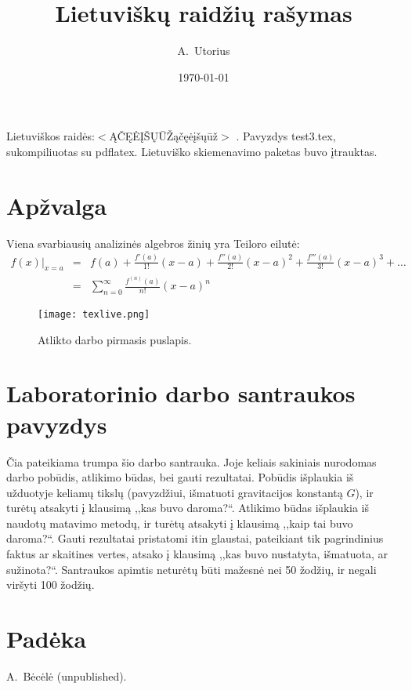 \documentclass{article}
\begin{document}
\author{A.\ Utorius}
\title{Lietuvi{\v s}kų raid{\v z}ių ra{\v s}ymas}
\date{\today}

\maketitle

Lietuviškos raid{\.e}s:$<$ĄČĘĖĮŠŲŪŽąčęėįšųūž$>$ \cite{ref1}.
Pavyzdys {\sf test3.tex}, sukompiliuotas su \textsf{pdflatex}.
Lietuviško skiemenavimo paketas buvo įtrauktas.

\section{Apžvalga}

Viena svarbiausių analizinės algebros žinių yra Teiloro eilutė:
\begin{align}
f(x)\big|_{x=a} &=& f(a)
 + \frac{f'(a)}{1!} (x-a)
 + \frac{f''(a)}{2!} (x-a)^2
 + \frac{f'''(a)}{3!} (x-a)^3
 + \dots \nonumber \\
 &=& \sum\limits_{n=0}^{\infty} \frac{f^{(n)}(a)}{n!} (x-a)^n
\end{align}

\begin{figure}[b]
\texttt{[image: texlive.png]}
\caption{Atlikto darbo pirmasis puslapis.}
\label{fig-report}
\end{figure}

\section*{Laboratorinio darbo santraukos pavyzdys}

Čia pateikiama trumpa šio darbo santrauka. Joje keliais sakiniais
nurodomas darbo pobūdis, atlikimo būdas, bei gauti rezultatai. Pobūdis
išplaukia iš užduotyje keliamų tikslų (pavyzdžiui, išmatuoti
gravitacijos konstantą $G$), ir turėtų atsakyti į klausimą ,,kas buvo
daroma?{}``. Atlikimo būdas išplaukia iš naudotų matavimo metodų, ir
turėtų atsakyti į klausimą ,,kaip tai buvo daroma?{}``. Gauti
rezultatai pristatomi itin glaustai, pateikiant tik pagrindinius
faktus ar skaitines vertes, atsako į klausimą ,,kas buvo nustatyta,
išmatuota, ar sužinota?{}``. Santraukos apimtis neturėtų būti mažesnė
nei 50 žodžių, ir negali viršyti 100 žodžių.

\section*{Padėka}

\textit{}

\begin{thebibliography}{99}
 A.\ Bėcėlė (unpublished).
\end{thebibliography}
\end{document}
